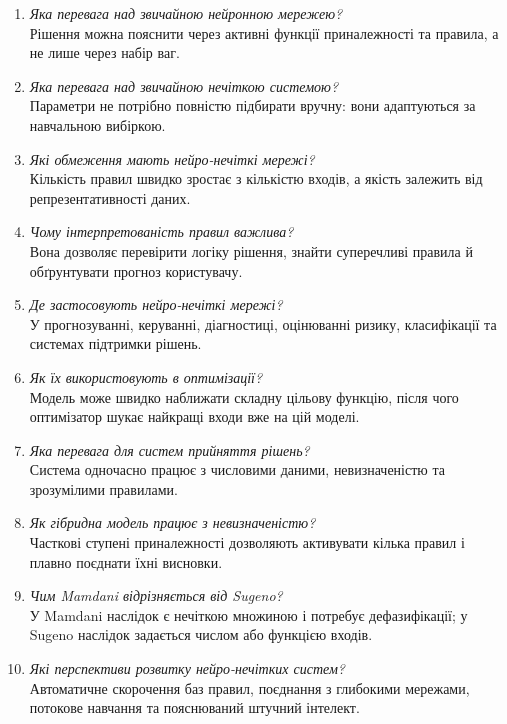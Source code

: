 \documentclass[12pt,a4paper]{article}
\begin{document}
\begin{enumerate}[leftmargin=*]
\item \textit{Яка перевага над звичайною нейронною мережею?}\\
Рішення можна пояснити через активні функції приналежності та правила, а не лише через набір ваг.
\item \textit{Яка перевага над звичайною нечіткою системою?}\\
Параметри не потрібно повністю підбирати вручну: вони адаптуються за навчальною вибіркою.
\item \textit{Які обмеження мають нейро-нечіткі мережі?}\\
Кількість правил швидко зростає з кількістю входів, а якість залежить від репрезентативності даних.
\item \textit{Чому інтерпретованість правил важлива?}\\
Вона дозволяє перевірити логіку рішення, знайти суперечливі правила й обґрунтувати прогноз користувачу.
\item \textit{Де застосовують нейро-нечіткі мережі?}\\
У прогнозуванні, керуванні, діагностиці, оцінюванні ризику, класифікації та системах підтримки рішень.
\item \textit{Як їх використовують в оптимізації?}\\
Модель може швидко наближати складну цільову функцію, після чого оптимізатор шукає найкращі входи вже на цій моделі.
\item \textit{Яка перевага для систем прийняття рішень?}\\
Система одночасно працює з числовими даними, невизначеністю та зрозумілими правилами.
\item \textit{Як гібридна модель працює з невизначеністю?}\\
Часткові ступені приналежності дозволяють активувати кілька правил і плавно поєднати їхні висновки.
\item \textit{Чим Mamdani відрізняється від Sugeno?}\\
У Mamdani наслідок є нечіткою множиною і потребує дефазифікації; у Sugeno наслідок задається числом або функцією входів.
\item \textit{Які перспективи розвитку нейро-нечітких систем?}\\
Автоматичне скорочення баз правил, поєднання з глибокими мережами, потокове навчання та пояснюваний штучний інтелект.
\end{enumerate}
\end{document}
